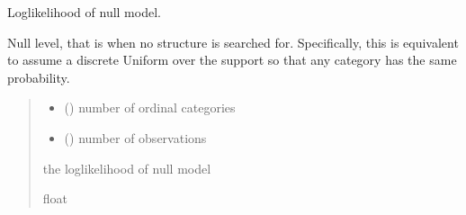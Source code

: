 \documentclass[letterpaper,10pt,english]{sphinxmanual}
\begin{document}
\begin{fulllineitems}
\label{\detokenize{cubmods:cubmods.general.luni}}
\pysigstartsignatures
{}
\pysigstopsignatures
\sphinxAtStartPar
Log\sphinxhyphen{}likelihood of null model.

\sphinxAtStartPar
Null level, that is when no 
structure is searched for. 
Specifically, this is equivalent to 
assume a discrete Uniform over 
the support so that any category 
has the same probability.
\begin{quote}\begin{description}
\begin{itemize}
\item {} 
\sphinxAtStartPar
{} () \textendash{} number of ordinal categories

\item {} 
\sphinxAtStartPar
{} () \textendash{} number of observations

\end{itemize}

\sphinxAtStartPar
the log\sphinxhyphen{}likelihood of null model

\sphinxAtStartPar
float

\end{description}\end{quote}

\end{fulllineitems}

\end{document}
